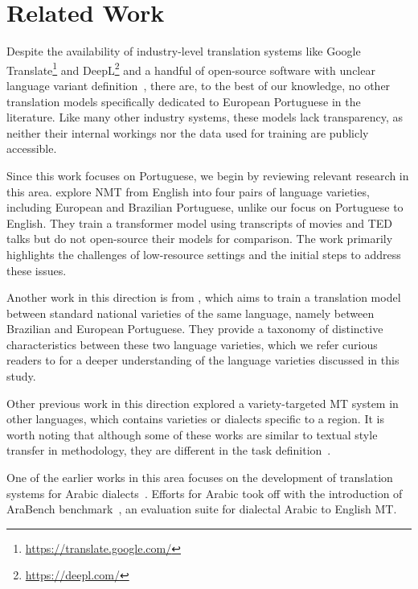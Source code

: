 \section{Related Work}
\label{sec:related_work}
Despite the availability of industry-level translation systems like Google Translate\footnote{\url{https://translate.google.com/} } and DeepL\footnote{\url{https://deepl.com/} } and a handful of open-source software with unclear language variant definition~\cite{Klein2017,Tiedemann2020},
there are, to the best of our knowledge, no other translation models specifically dedicated to European Portuguese in the literature. 
Like many other industry systems, these models lack transparency, as neither their internal workings nor the data used for training are publicly accessible.

Since this work focuses on Portuguese, we begin by reviewing relevant research in this area. \citet{Lakew2018} explore NMT from English into four pairs of language varieties, including European and Brazilian Portuguese, unlike our focus on Portuguese to English. 
They train a transformer model using transcripts of movies and TED talks but do not open-source their models for comparison. The work primarily highlights the challenges of low-resource settings and the initial steps to address these issues.

Another work in this direction is from \citet{CostaJussa2018}, which aims to train a translation model between standard national varieties of the same language, namely between Brazilian and European Portuguese.
They provide a taxonomy of distinctive characteristics between these two language varieties, which we refer curious readers to for a deeper understanding of the language varieties discussed in this study.

Other previous work in this direction explored a variety-targeted MT system in other languages, which contains varieties or dialects specific to a region.
It is worth noting that although some of these works are similar to textual style transfer in methodology, they are different in the task definition~\cite{Jhamtani2017}.

One of the earlier works in this area focuses on the development of translation systems for Arabic dialects~\cite {Zbib2012,Sajjad2013}. 
Efforts for Arabic took off with the introduction of AraBench benchmark~\cite{Sajjad2020}, an evaluation suite for dialectal Arabic to English MT.

